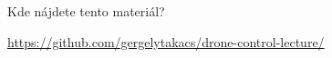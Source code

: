 \begin{frame}{Kde nájdete tento materiál?}
\begin{center}
{\LARGE \url{https://github.com/gergelytakacs/drone-control-lecture/}}
\end{center}
\end{frame}